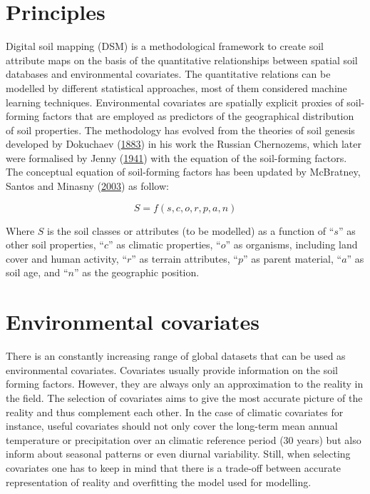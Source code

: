 \documentclass[
  10pt,
  b5paper,
  oneside]{book}
\begin{document}
\hypertarget{principles}{%
\section{Principles}\label{principles}}

Digital soil mapping (DSM) is a methodological framework to create soil attribute maps on the basis of the quantitative relationships between spatial soil databases and environmental covariates. The quantitative relations can be modelled by different statistical approaches, most of them considered machine learning techniques. Environmental covariates are spatially explicit proxies of soil-forming factors that are employed as predictors of the geographical distribution of soil properties. The methodology has evolved from the theories of soil genesis developed by Dokuchaev (\protect\hyperlink{ref-Dokuchaev1883}{1883}) in his work the Russian Chernozems, which later were formalised by Jenny (\protect\hyperlink{ref-Jenny1941}{1941}) with the equation of the soil-forming factors. The conceptual equation of soil-forming factors has been updated by McBratney, Santos and Minasny (\protect\hyperlink{ref-McBratney2003}{2003}) as follow:

\begin{equation} 
  S = f\left(s,c,o,r,p,a,n\right)
  \label{eq:scorpan}
\end{equation}

Where \(S\) is the soil classes or attributes (to be modelled) as a function of ``\(s\)'' as other soil properties, ``\(c\)'' as climatic properties, ``\(o\)'' as organisms, including land cover and human activity, ``\(r\)'' as terrain attributes, ``\(p\)'' as parent material, ``\(a\)'' as soil age, and ``\(n\)'' as the geographic position.

\hypertarget{environmental-covariates}{%
\section{Environmental covariates}\label{environmental-covariates}}

There is an constantly increasing range of global datasets that can be used as environmental covariates. Covariates usually provide information on the soil forming factors. However, they are always only an approximation to the reality in the field. The selection of covariates aims to give the most accurate picture of the reality and thus complement each other. In the case of climatic covariates for instance, useful covariates should not only cover the long-term mean annual temperature or precipitation over an climatic reference period (30 years) but also inform about seasonal patterns or even diurnal variability. Still, when selecting covariates one has to keep in mind that there is a trade-off between accurate representation of reality and overfitting the model used for modelling.
\end{document}
